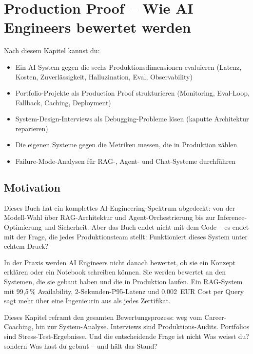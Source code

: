 \chapter{Production Proof -- Wie AI Engineers bewertet werden}
\label{chap:bewerbungsprozess}

\begin{lernziele}
Nach diesem Kapitel kannst du:
\begin{itemize}
    \item Ein AI-System gegen die sechs Produktionsdimensionen evaluieren (Latenz, Kosten, Zuverlässigkeit, Halluzination, Eval, Observability)
    \item Portfolio-Projekte als Production Proof strukturieren (Monitoring, Eval-Loop, Fallback, Caching, Deployment)
    \item System-Design-Interviews als Debugging-Probleme lösen (kaputte Architektur reparieren)
    \item Die eigenen Systeme gegen die Metriken messen, die in Produktion zählen
    \item Failure-Mode-Analysen für RAG-, Agent- und Chat-Systeme durchführen
\end{itemize}
\end{lernziele}

\section{Motivation}

Dieses Buch hat ein komplettes AI-Engineering-Spektrum abgedeckt: von der Modell-Wahl über RAG-Architektur und Agent-Orchestrierung bis zur Inference-Optimierung und Sicherheit. Aber das Buch endet nicht mit dem Code -- es endet mit der Frage, die jedes Produktionsteam stellt: \glqq Funktioniert dieses System unter echtem Druck?\grqq

In der Praxis werden AI Engineers nicht danach bewertet, ob sie ein Konzept erklären oder ein Notebook schreiben können. Sie werden bewertet an den Systemen, die sie gebaut haben und die in Produktion laufen. Ein RAG-System mit 99,5\,\% Availability, 2-Sekunden-P95-Latenz und 0,002~EUR Cost per Query sagt mehr über eine Ingenieurin aus als jedes Zertifikat.

Dieses Kapitel reframt den gesamten Bewertungsprozess: weg vom Career-Coaching, hin zur System-Analyse. Interviews sind Produktions-Audits. Portfolios sind Stress-Test-Ergebnisse. Und die entscheidende Frage ist nicht \glqq Was weisst du?\grqq{} sondern \glqq Was hast du gebaut -- und hält das Stand?\grqq

